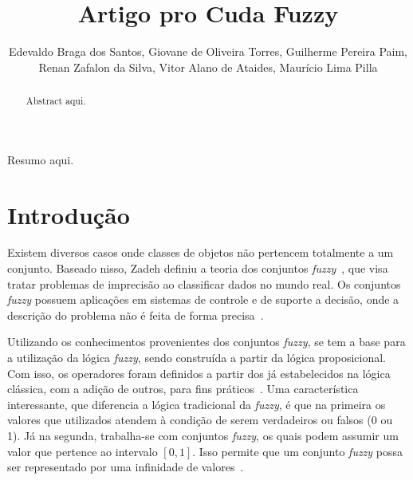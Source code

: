 \documentclass[12pt]{article}
\title{Artigo pro Cuda Fuzzy}
\author{Edevaldo Braga dos Santos\inst{1}, Giovane de Oliveira Torres\inst{1}, Guilherme Pereira Paim\inst{1},\\ Renan Zafalon da Silva\inst{1}, Vitor Alano de Ataides\inst{1}, Maurício Lima Pilla\inst{1}}
\begin{document}
\newcommand{\libname}{CudaFuzzy}

\maketitle

\begin{abstract}

Abstract aqui.

\end{abstract}

\begin{resumo}

Resumo aqui.

\end{resumo}

\section{Introdução}
\label{sec:introducao}


	Existem diversos casos onde classes de objetos não pertencem totalmente a um conjunto. Baseado nisso, Zadeh definiu a teoria dos conjuntos \textit{fuzzy}~\cite{zadeh:65}, que visa tratar problemas de imprecisão ao classificar dados no mundo real. Os conjuntos \textit{fuzzy} possuem aplicações em sistemas de controle e de suporte a decisão, onde a descrição do problema não é feita de forma precisa~\cite{weber:03}.
	
	Utilizando os conhecimentos provenientes dos conjuntos \textit{fuzzy}, se tem a base para a utilização da lógica \textit{fuzzy}, sendo construída a partir da lógica proposicional. Com isso, os operadores foram definidos a partir dos já estabelecidos na lógica clássica, com a adição de outros, para fins práticos~\cite{tanscheit:04}. Uma característica interessante, que diferencia a lógica tradicional da \textit{fuzzy}, é que na primeira os valores que utilizados atendem à condição de serem verdadeiros ou falsos (0 ou 1). Já na segunda, trabalha-se com conjuntos \textit{fuzzy}, os quais podem assumir um valor que pertence ao intervalo $[0, 1]$. Isso permite que um conjunto \textit{fuzzy} possa ser representado por uma infinidade de valores~\cite{klir:95}.	
	
\end{document}
